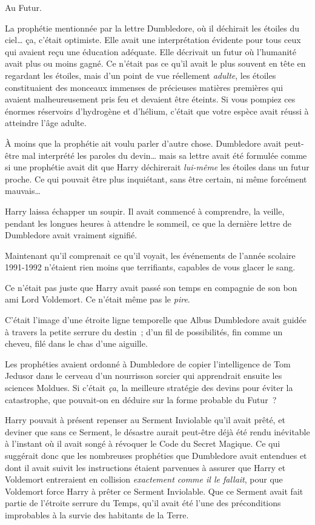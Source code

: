 Au Futur.

La prophétie mentionnée par la lettre Dumbledore, où il déchirait les étoiles du ciel… ça, c'était optimiste. Elle avait une interprétation évidente pour tous ceux qui avaient reçu une éducation adéquate. Elle décrivait un futur où l'humanité avait plus ou moins gagné. Ce n'était pas ce qu'il avait le plus souvent en tête en regardant les étoiles, mais d'un point de vue réellement \emph{adulte}, les étoiles constituaient des monceaux immenses de précieuses matières premières qui avaient malheureusement pris feu et devaient être éteints. Si vous pompiez ces énormes réservoirs d'hydrogène et d'hélium, c'était que votre espèce avait réussi à atteindre l'âge adulte.

À moins que la prophétie ait voulu parler d'autre chose. Dumbledore avait peut-être mal interprété les paroles du devin… mais sa lettre avait été formulée comme si une prophétie avait dit que Harry déchirerait \emph{lui-même} les étoiles dans un futur proche. Ce qui pouvait être plus inquiétant, sans être certain, ni même forcément mauvais…

Harry laissa échapper un soupir. Il avait commencé à comprendre, la veille, pendant les longues heures à attendre le sommeil, ce que la dernière lettre de Dumbledore avait vraiment signifié.

Maintenant qu'il comprenait ce qu'il voyait, les événements de l'année scolaire 1991-1992 n'étaient rien moins que terrifiants, capables de vous glacer le sang.

Ce n'était pas juste que Harry avait passé son temps en compagnie de son bon ami Lord Voldemort. Ce n'était même pas le \emph{pire}.

C'était l'image d'une étroite ligne temporelle que Albus Dumbledore avait guidée à travers la petite serrure du destin~; d'un fil de possibilités, fin comme un cheveu, filé dans le chas d'une aiguille.

Les prophéties avaient ordonné à Dumbledore de copier l'intelligence de Tom Jedusor dans le cerveau d'un nourrisson sorcier qui apprendrait ensuite les sciences Moldues. Si c'était \emph{ça}, la meilleure stratégie des devins pour éviter la catastrophe, que pouvait-on en déduire sur la forme probable du Futur~?

Harry pouvait à présent repenser au Serment Inviolable qu'il avait prêté, et deviner que sans ce Serment, le désastre aurait peut-être déjà été rendu inévitable à l'instant où il avait songé à révoquer le Code du Secret Magique. Ce qui suggérait donc que les nombreuses prophéties que Dumbledore avait entendues et dont il avait suivit les instructions étaient parvenues à assurer que Harry et Voldemort entreraient en collision \emph{exactement comme il le fallait}, pour que Voldemort force Harry à prêter ce Serment Inviolable. Que ce Serment avait fait partie de l'étroite serrure du Temps, qu'il avait été l'une des préconditions improbables à la survie des habitants de la Terre.

